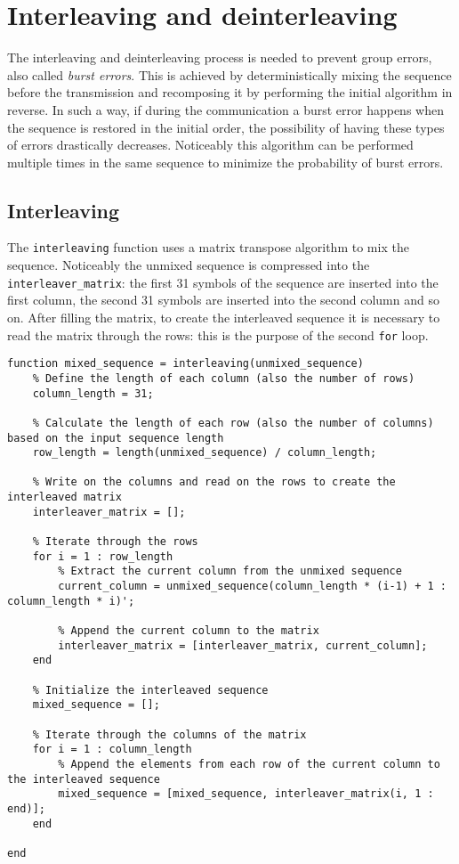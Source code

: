 \vspace{40px} \section{Interleaving and deinterleaving} \label{interleaving-process}
The interleaving and deinterleaving process is needed to prevent group errors, also called \textsl{burst errors}. This is achieved by deterministically mixing the sequence before the transmission and recomposing it by performing the initial algorithm in reverse. In such a way, if during the communication a burst error happens when the sequence is restored in the initial order, the possibility of having these types of errors drastically decreases. Noticeably this algorithm can be performed multiple times in the same sequence to minimize the probability of burst errors.


\subsection{Interleaving}\label{interleaving}
The \texttt{interleaving} function uses a matrix transpose algorithm to mix the sequence. Noticeably the unmixed sequence is compressed into the \texttt{interleaver\_matrix}: the first 31 symbols of the sequence are inserted into the first column, the second 31 symbols are inserted into the second column and so on. After filling the matrix, to create the interleaved sequence it is necessary to read the matrix through the rows: this is the purpose of the second \texttt{for} loop.

\begin{lstlisting}
function mixed_sequence = interleaving(unmixed_sequence)
    % Define the length of each column (also the number of rows)
    column_length = 31;

    % Calculate the length of each row (also the number of columns) based on the input sequence length
    row_length = length(unmixed_sequence) / column_length;

    % Write on the columns and read on the rows to create the interleaved matrix
    interleaver_matrix = [];

    % Iterate through the rows
    for i = 1 : row_length
        % Extract the current column from the unmixed sequence
        current_column = unmixed_sequence(column_length * (i-1) + 1 : column_length * i)';
        
        % Append the current column to the matrix
        interleaver_matrix = [interleaver_matrix, current_column];
    end
    
    % Initialize the interleaved sequence
    mixed_sequence = [];

    % Iterate through the columns of the matrix
    for i = 1 : column_length
        % Append the elements from each row of the current column to the interleaved sequence
        mixed_sequence = [mixed_sequence, interleaver_matrix(i, 1 : end)];
    end

end
\end{lstlisting}

